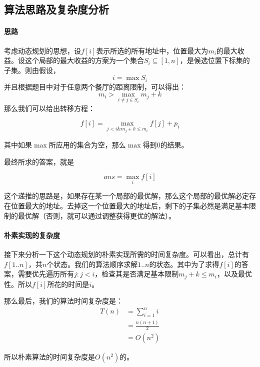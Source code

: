 \documentclass[UTF8]{ctexart}
\begin{document}
    \subsection*{算法思路及复杂度分析}
        \paragraph*{思路}
        考虑动态规划的思想，设$f[i]$表示所选的所有地址中，位置最大为$m_i$的最大收益。设这个局部的最大收益的方案为一个集合$S_i\subseteq [1, n]$，是候选位置下标集的子集。则由假设，
        $$i = \max{S_i}$$
        并且根据题目中对于任意两个餐厅的距离限制，可以得出：
        $$m_i > \max_{i\neq j\in S_i}{m_j} + k$$
        那么我们可以给出转移方程：

        $$f[i] = \max_{j < i \& m_j+k \leq m_i}{f[j]} + p_i$$

        其中如果$\max$所应用的集合为空，那么$\max$得到$0$的结果。

        最终所求的答案，就是

        $$ans=\max_i{f[i]}$$

        这个递推的思路是，如果存在某一个局部的最优解，那么这个局部的最优解必定存在位置最大的地址。去掉这一个位置最大的地址后，剩下的子集必然是满足基本限制的最优解（否则，就可以通过调整获得更优的解法）。

        \paragraph*{朴素实现的复杂度}
        接下来分析一下这个动态规划的朴素实现所需的时间复杂度。可以看出，总计有$f[1..n]$，共$n$个状态。我们的算法顺序求解$1..n$的状态。其中为了求得$f[i]$的答案，需要优先遍历所有${j: j < i}$，检查其是否满足基本限制$m_j+k\leq m_i$，以及最优性。所以$f[i]$所花的时间是$i$。

        那么最后，我们的算法时间复杂度是：
        \begin{align*}
            T(n) 
            &= \sum_{i=1}^{n}{i} \\
            &= \frac{n(n+1)}{2} \\
            &= O(n^2)
        \end{align*}

        所以朴素算法的时间复杂度是$O(n^2)$的。
\end{document}

